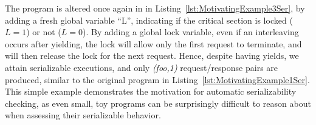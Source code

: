 The program is altered once again in in Listing~\ref{lst:MotivatingExample3Ser}, by adding a fresh global variable ``L'', indicating if the critical section is locked ($L=1$) or not ($L=0$).
By adding a global lock variable, even if an interleaving occurs after yielding, the lock will allow only the first request to terminate, and will then release the lock for the next request. Hence, despite having yields, we attain serializable executions, and only \textit{(foo,1)} request/response pairs are produced, similar to the original program in Listing~\ref{lst:MotivatingExample1Ser}.
%
This simple example demonstrates the motivation for automatic serializability checking, as even small, toy programs can be surprisingly difficult to reason about when assessing their serializable behavior.





